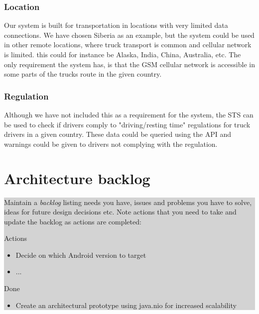 \documentclass[a4paper,11pt]{report}
\newcommand{\instructions}[1]{
  \noindent\colorbox{lightgray}{%
    \parbox{\linewidth}{%
      #1
    }%
  }%
 \vspace{0.1cm}
}
\begin{document}
\subsection{Location}
\label{sec:location}
Our system is built for transportation in locations with very limited data connections. We have chosen Siberia as an example, but the system could be used in other remote locations, where truck transport is common and cellular network is limited. this could for instance be Alaska, India, China, Australia, etc. The only requirement the system has, is that the GSM cellular network is accessible in some parts of the trucks route in the given country.

\subsection{Regulation}
\label{sec:regulation}
Although we have not included this as a requirement for the system, the STS can be used to check if drivers comply to "driving/resting time" regulations for truck drivers in a given country. These data could be queried using the API and warnings could be given to drivers not complying with the regulation.

\appendix

\chapter{Architecture backlog}
\label{cha:architecture-backlog}
\thispagestyle{fancy}

\instructions{ Maintain a \emph{backlog} listing needs you have,
  issues and problems you have to solve, ideas for future design
  decisions etc. Note actions that you need to take and update the
  backlog as actions are completed:

\bigskip
Actions

\begin{itemize}
\item Decide on which Android version to target
\item ...
\end{itemize}

Done

\begin{itemize}
\item Create an architectural prototype using java.nio for increased
  scalability

\end{itemize}


}
\end{document}
